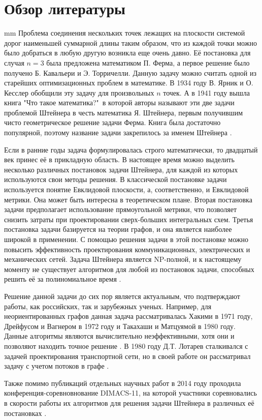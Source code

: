 \newpage
\section*{\LARGE{Обзор литературы}}
 mm
Проблема соединения нескольких точек лежащих на плоскости системой дорог наименьшей суммарной длины таким образом, что из каждой точки можно было добраться в любую другую возникла еще очень давно. Её постановка для случая $n = 3$ была предложена математиком П. Ферма, а первое решение было получено Б. Кавальери и Э. Торричелли. Данную задачу можно считать одной из старейших оптимизационных проблем в математике. В 1934 году В. Ярник и О. Кесслер обобщили эту задачу для произвольных $n$ точек. А в 1941 году вышла книга "Что такое математика?"\, в которой авторы называют эти две задачи проблемой Штейнера в честь математика Я. Штейнера, первым получившим чисто геометрическое решение задачи Ферма. Книга была достаточно популярной, поэтому название задачи закрепилось за именем Штейнера \cite{SteinerProblemWiki}.
\par
Если в ранние годы задача формулировалась строго математически, то двадцатый век принес её в прикладную область. В настоящее время можно выделить несколько различных постановок задачи Штейнера, для каждой из которых используются свои методы решения. В классической постановке задачи используется понятие Евклидовой плоскости, а, соответственно, и Евклидовой метрики. Она может быть интересна в теоретическом плане. Вторая постановка задачи предполагает использование прямоугольной метрики, что позволяет снизить затраты при проектировании сверх-больших интегральных схем. Третья постановка задачи базируется на теории графов, и она является наиболее широкой в применении. С помощью решения задачи в этой постановке можно повысить эффективность проектирования коммуникационных, электрических и механических сетей. Задача Штейнера является NP-полной, и к настоящему моменту не существует алгоритмов для любой из постановок задачи, способных решить её за полиномиальное время \cite{SteinerOverview}.
\par
Решение данной задачи до сих пор является актуальным, что подтверждают работы, как российских, так и зарубежных ученых. Например, для неориентированных графов данная задача рассматривалась Хакими в 1971 году, Дрейфусом и Вагнером в 1972 году и Такахаши и Матцуямой в 1980 году. Данные алгоритмы являются вычислительно неэффективными, хотя они и позволяют находить точное решение \cite{SteinerProblemInGraphs}. В 1980 году  Д.Т. Лотарев сталкивался с задачей проектирования транспортной сети, но в своей работе он рассматривал задачу с учетом потоков в графе  \cite{Lotarev1980}. 
\par
Также помимо публикаций отдельных научных работ в 2014 году проходила конференция-соревновнование DIMACS-11, на которой участники соревновались в скорости работы их алгоритмов для решения задачи Штейнера в различных её постановках \cite{Dimacs11}.
